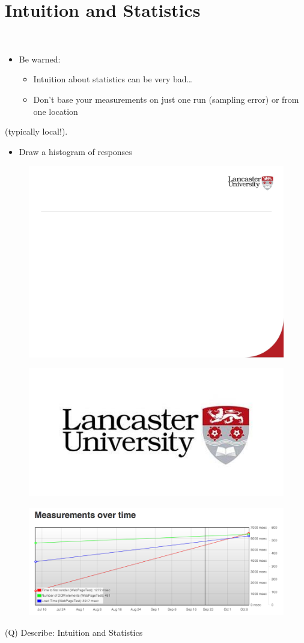 \documentclass[12pt]{article}
\begin{document}
\section{Intuition and Statistics}
\\
\begin{itemize}
  \item Be warned:
\begin{itemize}
  \item Intuition about statistics can be very bad…
  \item Don’t base your measurements on just one run (sampling error) or from one location 
\end{itemize}
\end{itemize}
(typically local!).\\
\begin{itemize}
  \item Draw a histogram of responses
\end{itemize}
\begin{figure}[H]
\includegraphics[width=0.5\linewidth]{page58-image-1.png}
\end{figure}
\begin{figure}[H]
\includegraphics[width=0.5\linewidth]{page58-image-2.png}
\end{figure}
\begin{figure}[H]
\includegraphics[width=0.5\linewidth]{page58-image-3.png}
\end{figure}
\clearpage
(Q)
Describe: Intuition and Statistics
\clearpage
\end{document}
